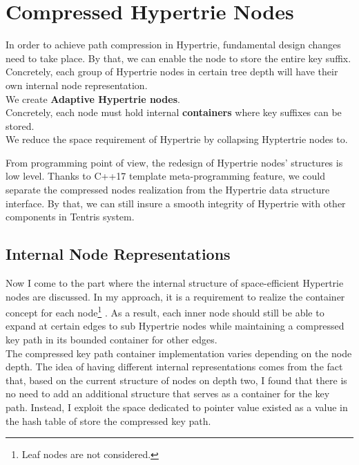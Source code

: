 \section{Compressed Hypertrie Nodes}
In order to achieve path compression in Hypertrie, fundamental design changes need to take place. 
By that, we can enable the node to store the entire key suffix. 
Concretely, each group of Hypertrie nodes in certain tree depth will have their own internal node representation.  \\

We create \textbf{Adaptive Hypertrie nodes}. \\

Concretely, each node must hold internal \textbf{containers} where key suffixes can be stored. \\

We reduce the space requirement of Hypertrie by collapsing Hyptertrie nodes to. \\


From programming point of view, the redesign of Hypertrie nodes' structures is low level. Thanks to C++17 template meta-programming feature, we could separate the compressed nodes realization from the Hypertrie data structure interface. By that, we can still insure a smooth integrity of Hypertrie with other components in Tentris system. \\

\subsection{Internal Node Representations}
\label{ch:approach_node_structure}
Now I come to the part where the internal structure of space-efficient Hypertrie nodes are discussed. 
In my approach, it is a requirement to realize the container concept for each node\footnote{Leaf nodes are not considered.} . 
As a result, each inner node should still be able to expand at certain edges to sub Hypertrie nodes while maintaining a compressed key path in its bounded container for other edges. \\

The compressed key path container implementation varies depending on the node depth. 
The idea of having different internal representations comes from the fact that, based on the current structure of nodes on depth two, I found that there is no need to add an additional structure that serves as a container for the key path. 
Instead, I exploit the space dedicated to pointer value existed as a value in the hash table of store the compressed key path. \\ 

